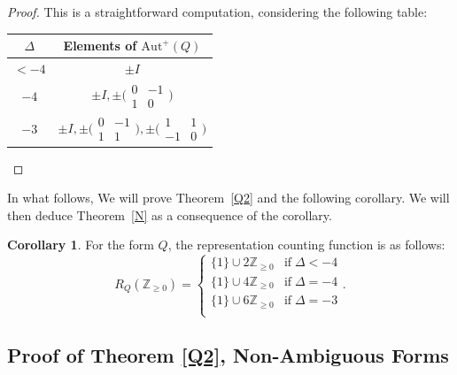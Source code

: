 \documentclass[11pt]{amsart}
\theoremstyle{definition}
\newtheorem{corollary}{Corollary}[theorem]
\begin{document}
\begin{proof}
    This is a straightforward computation, considering the following table:
    
    \begin{center}
        \begin{tabular}{c|c}
        $\Delta$ & Elements of $\text{Aut}^+(Q)$ \\\hline
        $<-4$ & $\pm I$\\
        $-4$ & $\pm I,\pm \big(\begin{smallmatrix} 0&-1\\1&0\end{smallmatrix}\big)$\\
        $-3$ & $\pm I,\pm \big(\begin{smallmatrix} 0&-1\\1&1\end{smallmatrix}\big),\pm \big(\begin{smallmatrix} 1&1\\-1&0\end{smallmatrix}\big)$
        \end{tabular}
    \end{center}
\end{proof}

In what follows, We will prove Theorem~\ref{Q2} and the following corollary. We will then 
deduce Theorem~\ref{N} as a consequence of the corollary.  

\begin{corollary}\label{Raw_Counts}
    For the form $Q$, the representation counting function is as follows:
    \[R_Q(\mathbb{Z}_{\geq 0})=\begin{cases}
        \{1\}\cup 2\mathbb{Z}_{\geq 0}&\text{if}\;\Delta<-4\\
        \{1\}\cup 4\mathbb{Z}_{\geq 0}&\text{if}\;\Delta=-4\\
        \{1\}\cup 6\mathbb{Z}_{\geq 0}&\text{if}\;\Delta=-3\\
    \end{cases}.\]
\end{corollary}

\subsection{Proof of Theorem \ref{Q2}, Non-Ambiguous Forms}\label{Q_Non_Ambiguous}
\end{document}
